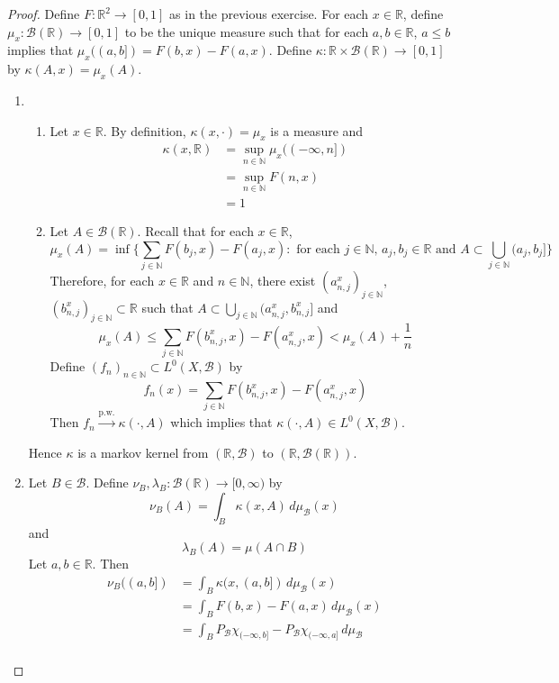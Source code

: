 \documentclass[12pt]{amsart}
\theoremstyle{definition}
\newcommand{\lam}{\lambda}
\newcommand{\kap}{\kappa}
\newcommand{\N}{\mathbb{N}}
\newcommand{\R}{\mathbb{R}}
\newcommand{\MB}{\mathcal{B}}
\newcommand{\dmu}{\, d \mu}
\newcommand{\Rg}{[0,\infty)}
\newcommand{\convt}[1]{\xrightarrow{\text{#1}}}
\begin{document}
	\begin{proof} Define $F:\R^2 \rightarrow [0,1]$ as in the previous exercise. For each $x \in \R$, define $\mu_x: \MB(\R) \rightarrow [0,1]$ to be the unique measure such that for each $a, b \in \R$, $a \leq b$ implies that $\mu_x((a,b]) = F(b, x) - F(a, x)$. Define $\kap: \R \times \MB(\R) \rightarrow [0,1]$ by $\kap(A, x) = \mu_x(A)$. \\
		\begin{enumerate}
			\item \
			\begin{enumerate}
				\item Let $x \in \R$. By definition, $\kap(x, \cdot) = \mu_x$ is a measure and 
				\begin{align*}
					\kap(x, \R) 
					& = \sup_{n \in \N} \mu_x((-\infty, n])\\
					& = \sup_{n \in \N} F(n, x) \\
					& = 1 
				\end{align*}
				\item Let $A \in \MB(\R)$. Recall that for each $x \in \R$,
				$$\mu_x(A) = \inf \bigg \{ \sum\limits_{j \in \N} F(b_j, x) - F(a_j, x): \text{ for each $j \in \N$, $a_j, b_j \in \R$ and } A \subset \bigcup\limits_{j \in \N} (a_j, b_j] \bigg \}$$ 
				Therefore, for each $x \in \R$ and $n \in \N$, there exist $(a^x_{n,j})_{j \in \N}$, $(b^x_{n,j})_{j \in \N} \subset \R$ such that $A \subset \bigcup\limits_{j \in \N} (a^x_{n,j}, b^x_{n,j}]$ and 
				$$\mu_x(A) \leq \sum\limits_{j \in \N} F(b^x_{n,j}, x) - F(a^x_{n,j}, x) < \mu_x(A) + \frac{1}{n}$$
				Define $(f_n)_{n \in \N} \subset L^0(X, \MB)$ by $$f_n(x) = \sum\limits_{j \in \N} F(b^x_{n,j}, x) - F(a^x_{n,j}, x)$$
				Then $f_n \convt{p.w.} \kap(\cdot, A)$ which implies that $\kap(\cdot, A) \in L^0(X, \MB)$. 
			\end{enumerate}
			Hence $\kap$ is a markov kernel from $(\R, \MB)$ to $(\R, \MB(\R))$.\\
			\item Let $B \in \MB$. Define $\nu_B, \lam_{B}:\MB(\R) \rightarrow \Rg$ by 
			$$\nu_B(A) = \int_B \kap(x, A) \dmu_{\MB}(x)$$ 
			and
			$$\lam_B(A) = \mu(A \cap B)$$ 
			Let $a,b \in \R$. Then 
			\begin{align*}
				\nu_B((a,b]) 
				& = \int_B \kap(x, (a,b]) \dmu_{\MB}(x) \\
				& = \int_{B} F(b, x) - F(a,x) \dmu_{\MB}(x) \\
				& = \int_{B} P_{\MB}\chi_{(-\infty, b]} - P_{\MB}\chi_{(-\infty, a]} \dmu_{\MB} \\

\end{align*}
\end{enumerate}
\end{proof}
\end{document}

